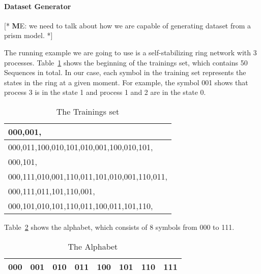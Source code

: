 \documentclass[
a4paper,     %
12pt         %
]{scrartcl}  %
\newcommand\me[1]{ [* {\textbf ME:} #1 *]}
\begin{document}
\paragraph{Dataset Generator} \me{we need to talk about how we are capable of generating dataset from a prism model.}
\par The running example we are going to use is a self-stabilizing ring network with 3 processes.
Table~\ref{table:trainingsSet} shows the beginning of the trainings set, which contains 50 Sequences in total.  In our case, each symbol in the training set represents the states in the ring at a given moment. For example, the symbol 001 shows that process 3 is in the state 1 and process 1 and 2 are in the state 0.

\begin{table}[ht!]
\centering
\begin{tabular}{|l|}
\hline
000,001,                                    \\ \hline
000,011,100,010,101,010,001,100,010,101,   \\ \hline
000,101,                                    \\ \hline
000,111,010,001,110,011,101,010,001,110,011, \\ \hline
000,111,011,101,110,001,                    \\ \hline
000,101,010,101,110,011,100,011,101,110,    \\ \hline
\end{tabular}
\caption{The Trainings set}
\label{table:trainingsSet}
\end{table}

Table~\ref{table:alphabet} shows the alphabet, which consists of 8 symbols from 000 to 111.

\begin{table}[ht!]
\centering
\begin{tabular}{|l|l|l|l|l|l|l|l|}
\hline
000 & 001 & 010 & 011 & 100 & 101 & 110 & 111 \\ \hline
\end{tabular}
\caption{The Alphabet}
\label{table:alphabet}
\end{table}
\end{document}
